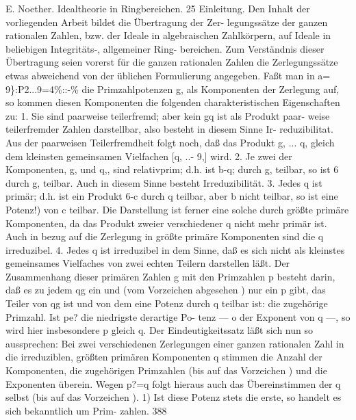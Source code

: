 \documentclass[11pt,a4paper]{article}
\theoremstyle{plain}
\theoremstyle{definition}
\begin{document}
E. Noether. 
Idealtheorie in Ringbereichen. 
25 
Einleitung. 
Den Inhalt der vorliegenden Arbeit bildet die Übertragung der Zer- 
legungssätze der ganzen rationalen Zahlen, bzw. der Ideale in algebraischen 
Zahlkörpern, 
auf Ideale 
in beliebigen Integritäts-, 
allgemeiner Ring- 
bereichen. 
Zum Verständnis 
dieser Übertragung 
seien 
vorerst 
für die 
ganzen rationalen Zahlen die Zerlegungssätze etwas abweichend von der 
üblichen Formulierung angegeben. 
Faßt man in 
a= 9\}:P2\textdegree{}...9=4\%::-\% 
die Primzahlpotenzen g, als Komponenten der Zerlegung auf, so kommen 
diesen Komponenten die folgenden charakteristischen Eigenschaften zu: 
1. Sie sind paarweise teilerfremd; aber kein gq ist als Produkt paar- 
weise teilerfremder Zahlen darstellbar, 
also besteht in diesem Sinne Ir- 
reduzibilitat. 
Aus der paarweisen Teilerfremdheit 
folgt noch, daß 
das 
Produkt g, ... q, gleich dem kleinsten gemeinsamen Vielfachen [q, ..- 9,] 
wird. 
2. Je zwei der Komponenten, 
g, und q,, sind relativprim; 
d.h. ist 
b-q; durch g, teilbar, 
so ist 6 durch g, teilbar. 
Auch in diesem Sinne 
besteht Irreduzibilität. 
3. Jedes q ist primär; 
d.h. ist ein Produkt 6-c durch q teilbar, 
aber b nicht teilbar, so ist eine Potenz!) von c teilbar. 
Die Darstellung 
ist ferner eine solche durch größte primäre Komponenten, da das Produkt 
zweier verschiedener q nicht mehr primär ist. 
Auch in bezug auf die 
Zerlegung in größte primäre Komponenten sind die q irreduzibel. 
4. Jedes q ist irreduzibel in dem Sinne, daß es sich nicht als kleinstes 
gemeinsames Vielfaches von zwei echten Teilern darstellen läßt. 
Der Zusammenhang dieser primären Zahlen g mit den Primzahlen p 
besteht darin, daß es zu jedem qg ein und (vom Vorzeichen abgesehen ) 
nur ein p gibt, das Teiler von qg ist und von dem eine Potenz durch q 
teilbar ist: die zugehörige Primzahl. 
Ist pe? die niedrigste derartige Po- 
tenz --- o der Exponent von q ---, so wird hier insbesondere p\textdegree{} gleich q. 
Der Eindeutigkeitssatz läßt sich nun so aussprechen: 
Bei zwei verschiedenen Zerlegungen einer ganzen rationalen Zahl in 
die irreduziblen, 
größten primären Komponenten q stimmen die Anzahl 
der Komponenten, 
die zugehörigen Primzahlen (bis auf das Vorzeichen ) 
und die Exponenten 
überein. 
Wegen p?=q 
folgt hieraus auch das 
Übereinstimmen der q selbst (bis auf das Vorzeichen ). 
1) Ist diese Potenz stets die erste, 
so handelt 
es sich bekanntlich um Prim- 
zahlen. 
388
\end{document}
